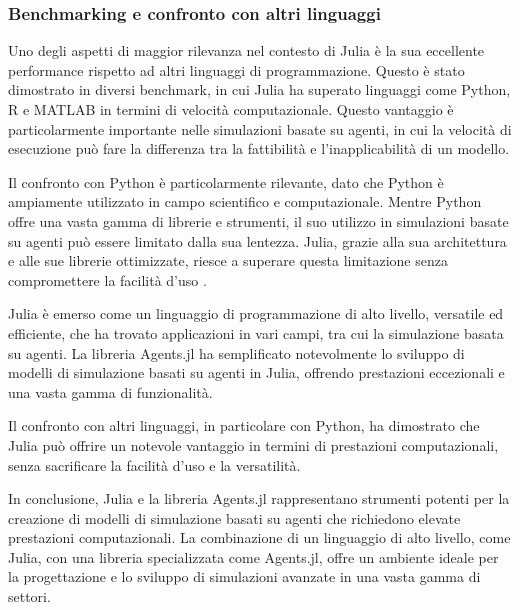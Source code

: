 \subsubsection{Benchmarking e confronto con altri linguaggi}

Uno degli aspetti di maggior rilevanza nel contesto di Julia è la sua 
eccellente performance rispetto ad altri linguaggi di programmazione. 
Questo è stato dimostrato in diversi benchmark, in cui Julia ha superato 
linguaggi come Python, R e MATLAB \cite{ABAR201713} in termini di velocità 
computazionale. Questo vantaggio è particolarmente importante nelle 
simulazioni basate su agenti, in cui la velocità di esecuzione può fare 
la differenza tra la fattibilità e l'inapplicabilità di un modello.

Il confronto con Python è particolarmente rilevante, dato che Python è 
ampiamente utilizzato in campo scientifico e computazionale. Mentre 
Python offre una vasta gamma di librerie e strumenti, il suo utilizzo 
in simulazioni basate su agenti può essere limitato dalla sua lentezza. 
Julia, grazie alla sua architettura e alle sue librerie ottimizzate, 
riesce a superare questa limitazione senza compromettere la facilità 
d'uso  \cite{Flux.jl-2018} \cite{innes:2018} \cite{pal2023lux} 
\cite{rackauckas2019diffeqflux} \cite{rackauckas2020universal} 
\cite{rackauckas2017differentialequations}.

Julia è emerso come un linguaggio di programmazione di alto livello, 
versatile ed efficiente, che ha trovato applicazioni in vari campi, 
tra cui la simulazione basata su agenti. La libreria Agents.jl ha 
semplificato notevolmente lo sviluppo di modelli di simulazione basati 
su agenti in Julia, offrendo prestazioni eccezionali e una vasta gamma 
di funzionalità.

Il confronto con altri linguaggi, in particolare con Python, 
ha dimostrato che Julia può offrire un notevole vantaggio in termini 
di prestazioni computazionali, senza sacrificare la facilità d'uso e 
la versatilità.

In conclusione, Julia e la libreria Agents.jl rappresentano strumenti 
potenti per la creazione di modelli di simulazione basati su agenti che 
richiedono elevate prestazioni computazionali. La combinazione di un 
linguaggio di alto livello, come Julia, con una libreria specializzata 
come Agents.jl, offre un ambiente ideale per la progettazione e lo 
sviluppo di simulazioni avanzate in una vasta gamma di settori.

